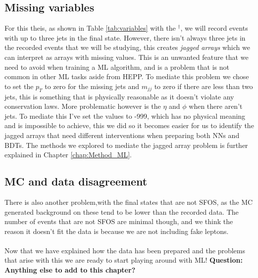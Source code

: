 \documentclass[12pt, a4paper]{book}
\begin{document}
\subsection{Missing variables}\label{sec:jagged_arrays}
For this theis, as shown in Table \ref{tab:variables} with the $^\dagger$, we will record events with up to three jets in the final state. However, there isn't always three jets in the recorded events that we will be studying, 
this creates \textit{jagged arrays} which we can interpret as arrays with missing values. This is an unwanted feature that we need to avoid when training a ML algorithm, and is a problem that is not common in other ML tasks aside from HEPP.
To mediate this problem we chose to set the $p_T$ to zero for the missing jets and $m_{jj}$ to zero if there are less than two jets, this is something that is physically reasonable as it doesn't violate any conservation laws. 
More problematic however is the $\eta$ and $\phi$ when there aren't jets. To mediate this I've set the values to -999, which has no physical meaning and is impossible to achieve, this we did so it becomes easier for us to identify the jagged arrays that 
need different interventions when preparing both NNs and BDTs. The methods we explored to mediate the jagged array problem is further explained in Chapter \ref{chap:Method_ML}. 

\subsection{MC and data disagreement} 
There is also another problem,with the final states that are not SFOS, as the MC generated background 
on these tend to be lower than the recorded data. The number of events that are not SFOS are minimal though, and we think the reason it doesn't fit the data is because we are not including fake leptons. \\
\\Now that we have explained how the data has been prepared and the problems that arise with this we are ready to start playing around with ML!
\textbf{Question: Anything else to add to this chapter?}
\end{document}
